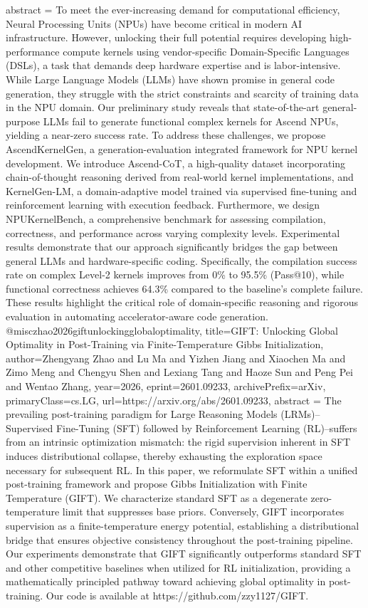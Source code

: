 {      abstract = {To meet the ever-increasing demand for computational efficiency, Neural Processing Units (NPUs) have become critical in modern AI infrastructure. However, unlocking their full potential requires developing high-performance compute kernels using vendor-specific Domain-Specific Languages (DSLs), a task that demands deep hardware expertise and is labor-intensive. While Large Language Models (LLMs) have shown promise in general code generation, they struggle with the strict constraints and scarcity of training data in the NPU domain. Our preliminary study reveals that state-of-the-art general-purpose LLMs fail to generate functional complex kernels for Ascend NPUs, yielding a near-zero success rate. To address these challenges, we propose AscendKernelGen, a generation-evaluation integrated framework for NPU kernel development. We introduce Ascend-CoT, a high-quality dataset incorporating chain-of-thought reasoning derived from real-world kernel implementations, and KernelGen-LM, a domain-adaptive model trained via supervised fine-tuning and reinforcement learning with execution feedback. Furthermore, we design NPUKernelBench, a comprehensive benchmark for assessing compilation, correctness, and performance across varying complexity levels. Experimental results demonstrate that our approach significantly bridges the gap between general LLMs and hardware-specific coding. Specifically, the compilation success rate on complex Level-2 kernels improves from 0\% to 95.5\% (Pass@10), while functional correctness achieves 64.3\% compared to the baseline's complete failure. These results highlight the critical role of domain-specific reasoning and rigorous evaluation in automating accelerator-aware code generation.}
}@misc{zhao2026giftunlockingglobaloptimality,
      title={GIFT: Unlocking Global Optimality in Post-Training via Finite-Temperature Gibbs Initialization}, 
      author={Zhengyang Zhao and Lu Ma and Yizhen Jiang and Xiaochen Ma and Zimo Meng and Chengyu Shen and Lexiang Tang and Haoze Sun and Peng Pei and Wentao Zhang},
      year={2026},
      eprint={2601.09233},
      archivePrefix={arXiv},
      primaryClass={cs.LG},
      url={https://arxiv.org/abs/2601.09233},
      abstract = {The prevailing post-training paradigm for Large Reasoning Models (LRMs)--Supervised Fine-Tuning (SFT) followed by Reinforcement Learning (RL)--suffers from an intrinsic optimization mismatch: the rigid supervision inherent in SFT induces distributional collapse, thereby exhausting the exploration space necessary for subsequent RL. In this paper, we reformulate SFT within a unified post-training framework and propose Gibbs Initialization with Finite Temperature (GIFT). We characterize standard SFT as a degenerate zero-temperature limit that suppresses base priors. Conversely, GIFT incorporates supervision as a finite-temperature energy potential, establishing a distributional bridge that ensures objective consistency throughout the post-training pipeline. Our experiments demonstrate that GIFT significantly outperforms standard SFT and other competitive baselines when utilized for RL initialization, providing a mathematically principled pathway toward achieving global optimality in post-training. Our code is available at https://github.com/zzy1127/GIFT.}
}
